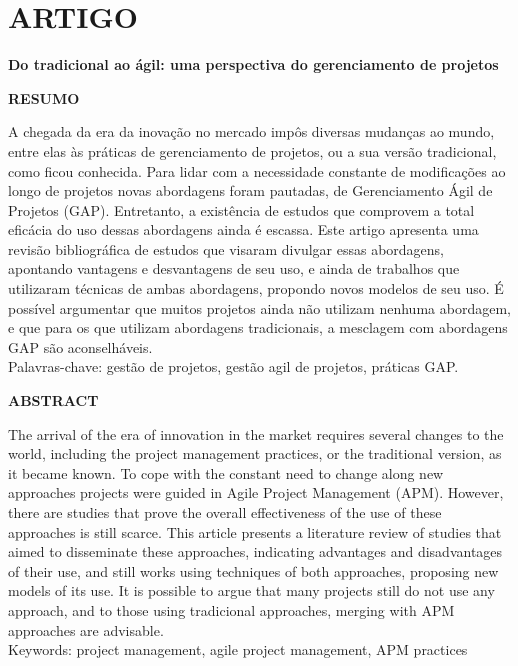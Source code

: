 \anexo
\chapter{ARTIGO}

\begin{center}
  {\large \textbf{Do tradicional ao ágil: uma perspectiva do gerenciamento de projetos}}
\end{center}

\begin{center}
  \textbf{RESUMO}
\end{center}

\singlespacing
\noindent A chegada da era da inovação no mercado impôs diversas mudanças ao mundo, entre elas às práticas de gerenciamento de projetos, ou a sua versão tradicional, como ficou conhecida. Para lidar com a necessidade constante de modificações ao longo de projetos novas abordagens foram pautadas, de Gerenciamento Ágil de Projetos (GAP). Entretanto, a existência de estudos que comprovem a total eficácia do uso dessas abordagens ainda é escassa. Este artigo apresenta uma revisão bibliográfica de estudos que visaram divulgar essas abordagens, apontando vantagens e desvantagens de seu uso, e ainda de trabalhos que utilizaram técnicas de ambas abordagens, propondo novos modelos de seu uso. É possível argumentar que muitos projetos ainda não utilizam nenhuma abordagem, e que para os que utilizam abordagens tradicionais, a mesclagem com abordagens GAP são aconselháveis. \\
\noindent Palavras-chave: gestão de projetos, gestão agil de projetos, práticas GAP.


\begin{center}
  \textbf{ABSTRACT}
\end{center}

\singlespacing
\noindent The arrival of the era of innovation in the market requires several changes to the world, including the project management practices, or the traditional version, as it became known. To cope with the constant need to change along new approaches projects were guided in Agile Project Management (APM). However, there are studies that prove the overall effectiveness of the use of these approaches is still scarce. This article presents a literature review of studies that aimed to disseminate these approaches, indicating advantages and disadvantages of their use, and still works using techniques of both approaches, proposing new models of its use. It is possible to argue that many projects still do not use any approach, and to those using tradicional approaches, merging with APM approaches are advisable. \\
\noindent Keywords: project management, agile project management, APM practices


